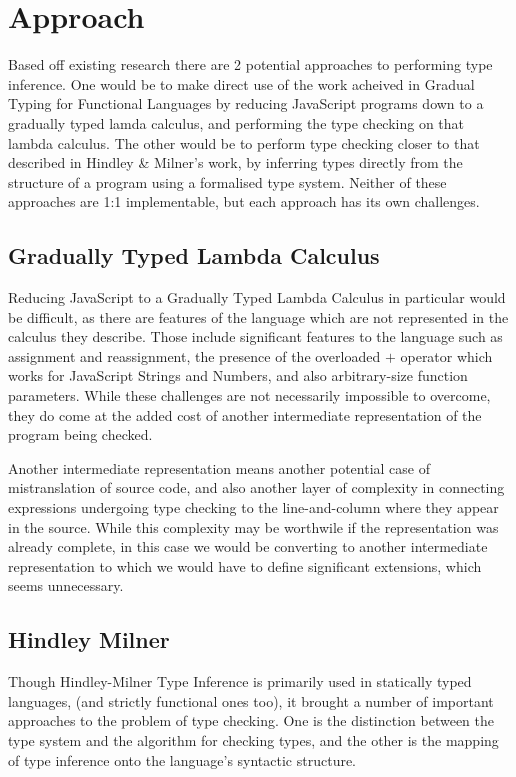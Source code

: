 \documentclass[british, twoside]{bhamthesis}
\theoremstyle{definition}
\begin{document}
  \section{Approach}

    Based off existing research there are 2 potential approaches to performing type inference. One would be to make direct use of the work acheived in Gradual Typing for Functional Languages\autocite{Siek2006} by reducing JavaScript programs down to a gradually typed lamda calculus, and performing the type checking on that lambda calculus. The other would be to perform type checking closer to that described in  Hindley \& Milner's work, by inferring types directly from the structure of a program using a formalised type system. Neither of these approaches are 1:1 implementable, but each approach has its own challenges.

  \subsection{Gradually Typed Lambda Calculus}

    Reducing JavaScript to a Gradually Typed Lambda Calculus in particular would be difficult, as there are features of the language which are not represented in the calculus they describe. Those include significant features to the language such as assignment and reassignment, the presence of the overloaded $+$ operator which works for JavaScript Strings and Numbers, and also arbitrary-size function parameters. While these challenges are not necessarily impossible to overcome, they do come at the added cost of another intermediate representation of the program being checked.

    Another intermediate representation means another potential case of mistranslation of source code, and also another layer of complexity in connecting expressions undergoing type checking to the line-and-column where they appear in the source. While this complexity may be worthwile if the representation was already complete, in this case we would be converting to another intermediate representation to which we would have to define significant extensions, which seems unnecessary.

  \subsection{Hindley Milner}
  \label{subsec:Hindley Milner}

    Though Hindley-Milner Type Inference is primarily used in statically typed languages, (and strictly functional ones too), it brought a number of important approaches to the problem of type checking. One is the distinction between the type system and the algorithm for checking types, and the other is the mapping of type inference onto the language's syntactic structure.
\end{document}

